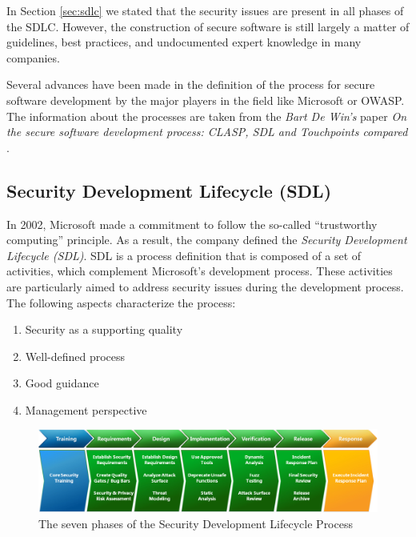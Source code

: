 \documentclass[12pt,a4,twoside]{article}
\begin{document}
In Section \ref{sec:sdlc} we stated that the security issues are present in all phases of the SDLC. However, the construction of secure software is still largely a matter of guidelines, best practices, and undocumented expert knowledge in many companies. \cite{on_secure_software}

Several advances have been made in the definition of the process for secure software development by the major players in the field like Microsoft or OWASP. The information about the processes are taken from the \textit{Bart De Win's} paper \textit{On the secure software development process: CLASP, SDL and Touchpoints compared} \cite{on_secure_software}.

\subsection{Security Development Lifecycle (SDL) \cite{on_secure_software}}

In 2002, Microsoft made a commitment to follow the so-called ``trustworthy computing'' principle. As a result, the company defined the \textit{Security Development Lifecycle (SDL)}. SDL is a process definition that is composed of a set of activities, which complement Microsoft's development process. These activities are particularly aimed to address security issues during the development process. The following aspects characterize the process:

\begin{enumerate}
    \item Security as a supporting quality
    \item Well-defined process
    \item Good guidance
    \item Management perspective
\end{enumerate}

\begin{figure}[h]
\centering
\includegraphics[width=1\textwidth]{figures/sdl_steps.jpg}
\caption{The seven phases of the Security Development Lifecycle Process \cite{sdl_wiki}}
\label{fig:sdl_phases}
\end{figure}
\end{document}
